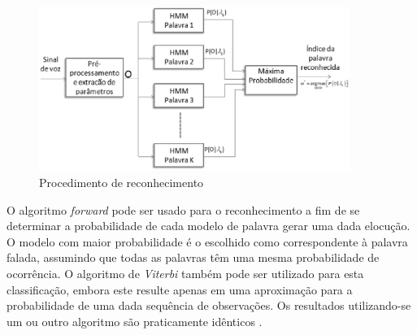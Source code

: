 \begin{figure}[H]
\includegraphics[width=0.9\textwidth]{graficos/reconhecimento.eps}
\caption{Procedimento de reconhecimento}
\end{figure}

O algoritmo \textit{forward} pode ser usado para o reconhecimento a fim de se determinar a probabilidade de cada modelo de palavra gerar uma dada elocução. O modelo com maior probabilidade é o escolhido como correspondente à palavra falada, assumindo que todas as palavras têm uma mesma probabilidade de ocorrência. O algoritmo de \textit{Viterbi} também pode ser utilizado para esta classificação, embora este resulte apenas em uma aproximação
para a probabilidade de uma dada sequência de observações. Os resultados utilizando-se um ou outro algoritmo são praticamente idênticos \cite{RavIsolAnderson}.




 





